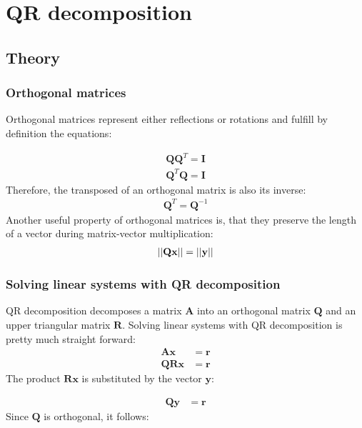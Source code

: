 \section{QR decomposition}
\label{sec:QR}

\subsection{Theory}

\subsubsection{Orthogonal matrices}
\label{sec:orthogonalMatrices}
Orthogonal matrices represent either reflections or rotations and fulfill by definition the equations:

\begin{align}
\label{eq:definitionOrthogonal0}
\mathbf{Q}\mathbf{Q}^T = \mathbf{I}\\
\label{eq:definitionOrthogonal1}
\mathbf{Q}^T\mathbf{Q} = \mathbf{I}
\end{align}
%
Therefore, the transposed of an orthogonal matrix is also its inverse:
\begin{align}
\label{eq:orthogonalInverse}
\mathbf{Q}^T = \mathbf{Q}^{-1}
\end{align}
%
Another useful property of orthogonal matrices is, that they preserve the length of a vector during matrix-vector multiplication:
\begin{align}
\label{eq:orthogonalPreserveLength}
\left\vert\left\vert\mathbf{Qx}\right\vert\right\vert= \left\vert\left\vert\mathbf{y}\right\vert\right\vert
\end{align}
%
\subsubsection{Solving linear systems with QR decomposition}

QR decomposition decomposes a matrix $\mathbf{A}$ into an orthogonal matrix $\mathbf{Q}$ and an upper triangular matrix $\mathbf{R}$. 
Solving linear systems with QR decomposition is pretty much straight forward:
\begin{align*}
\mathbf{A}\mathbf{x} &= \mathbf{r}\\
\mathbf{QR}\mathbf{x} &= \mathbf{r}
\end{align*}
%
The product $\mathbf{R}\mathbf{x}$ is substituted by the vector $\mathbf{y}$:

\begin{align*}
\mathbf{Qy} &= \mathbf{r}
\end{align*}
%
Since $\mathbf{Q}$ is orthogonal, it follows:


